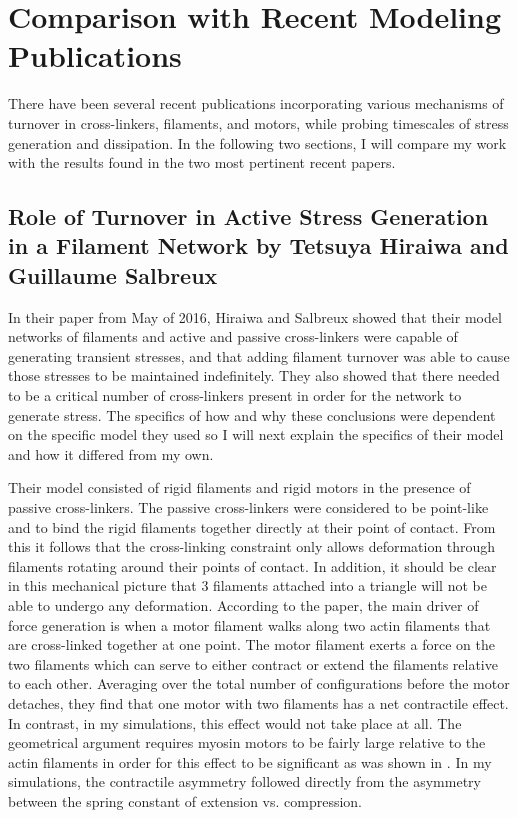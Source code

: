 \section{Comparison with Recent Modeling Publications}
There have been several recent publications incorporating various mechanisms of turnover in cross-linkers, filaments, and motors, while probing timescales of stress generation and dissipation.  In the following two sections, I will compare my work with the results found in the two most pertinent recent papers.

\subsection{Role of Turnover in Active Stress Generation in a Filament Network by Tetsuya Hiraiwa and Guillaume Salbreux}
In their paper from May of 2016, Hiraiwa and Salbreux showed that their model networks of filaments and active and passive cross-linkers were capable of generating transient stresses, and that adding filament turnover was able to cause those stresses to be maintained indefinitely. They also showed that there needed to be a critical number of cross-linkers present in order for the network to generate stress.  The specifics of how and why these conclusions were dependent on the specific model they used so I will next explain the specifics of their model and how it differed from my own.

Their model consisted of rigid filaments and rigid motors in the presence of passive cross-linkers.  The passive cross-linkers were considered to be point-like and to bind the rigid filaments together directly at their point of contact.  From this it follows that the cross-linking constraint only allows deformation through filaments rotating around their points of contact.  In addition, it should be clear in this mechanical picture that 3 filaments attached into a triangle will not be able to undergo any deformation.  According to the paper, the main driver of force generation is when a motor filament walks along two actin filaments that are cross-linked together at one point.  The motor filament exerts a force on the two filaments which can serve to either contract or extend the filaments relative to each other.  Averaging over the total number of configurations before the motor detaches, they find that one motor with two filaments has a net contractile effect.  In contrast, in my simulations, this effect would not take place at all.  The geometrical argument requires myosin motors to be fairly large relative to the actin filaments in order for this effect to be significant as was shown in \cite{PhysRevX.4.041002}.  In my simulations, the contractile asymmetry followed directly from the asymmetry between the spring constant of extension vs. compression.

